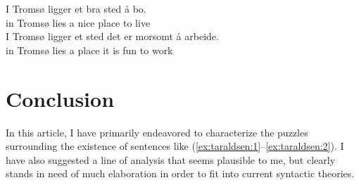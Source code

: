 \documentclass[output=paper]{LSP/langsci}
\begin{document}
\ea%
    \label{ex:taraldsen:61}
    \ea
\gll	* I Tromsø ligger et bra sted å bo.\\
        {}  in Tromsø lies   a  nice place to live\\

 \ex
\gll * I Tromsø ligger et sted det er morsomt å arbeide. \\
     {} in Tromsø lies   a place it   is  fun  to work\\
\z
\z

\section{Conclusion}\label{sec:taraldsen:5}

In this article, I have primarily endeavored to characterize the puzzles surrounding the existence of  sentences like (\ref{ex:taraldsen:1}--\ref{ex:taraldsen:2}). I have also suggested a line of analysis that seems plausible to me, but clearly stands in need of much elaboration in order to fit into current syntactic theories.
 

\printbibliography[heading=subbibliography,notkeyword=this]
\end{document}

